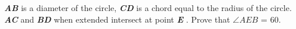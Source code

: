 \noindent \textbf{\textit{AB}} is a diameter of the circle, \textbf{\textit{CD}} is a chord equal to the radius of the circle.   \textbf{\textit{AC}} and \textbf{\textit{BD}} when extended intersect at point \textbf{\textit{E}} . Prove that $\angle AEB$ = 60\degree.


